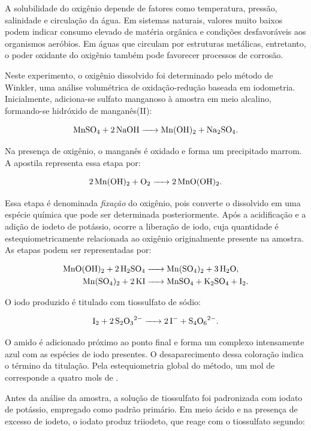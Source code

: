 \documentclass[a4paper,12pt]{article}
\begin{document}
A solubilidade do oxigênio depende de fatores como temperatura, pressão,
salinidade e circulação da água. Em sistemas naturais, valores muito baixos
podem indicar consumo elevado de matéria orgânica e condições desfavoráveis
aos organismos aeróbios. Em águas que circulam por estruturas metálicas,
entretanto, o poder oxidante do oxigênio também pode favorecer processos de
corrosão.

Neste experimento, o oxigênio dissolvido foi determinado pelo método de
Winkler, uma análise volumétrica de oxidação-redução baseada em iodometria.
Inicialmente, adiciona-se sulfato manganoso à amostra em meio alcalino,
formando-se hidróxido de manganês(II):

\begin{equation}
\ce{MnSO4 + 2NaOH -> Mn(OH)2 + Na2SO4}.
\end{equation}

Na presença de oxigênio, o manganês é oxidado e forma um precipitado marrom.
A apostila representa essa etapa por:

\begin{equation}
\ce{2Mn(OH)2 + O2 -> 2MnO(OH)2}.
\end{equation}

Essa etapa é denominada \textit{fixação} do oxigênio, pois converte o
 dissolvido em uma espécie química que pode ser determinada
posteriormente. Após a acidificação e a adição de iodeto de potássio, ocorre
a liberação de iodo, cuja quantidade é estequiometricamente relacionada ao
oxigênio originalmente presente na amostra. As etapas podem ser representadas
por:

\begin{align}
\ce{MnO(OH)2 + 2H2SO4 &-> Mn(SO4)2 + 3H2O},\\
\ce{Mn(SO4)2 + 2KI &-> MnSO4 + K2SO4 + I2}.
\end{align}

O iodo produzido é titulado com tiossulfato de sódio:

\begin{equation}
\ce{I2 + 2S2O3^2- -> 2I- + S4O6^2-}.
\end{equation}

O amido é adicionado próximo ao ponto final e forma um complexo intensamente
azul com as espécies de iodo presentes. O desaparecimento dessa coloração
indica o término da titulação. Pela estequiometria global do método, um mol de
 corresponde a quatro mols de .

Antes da análise da amostra, a solução de tiossulfato foi padronizada com
iodato de potássio, empregado como padrão primário. Em meio ácido e na
presença de excesso de iodeto, o iodato produz triiodeto, que reage com o
tiossulfato segundo:
\end{document}
